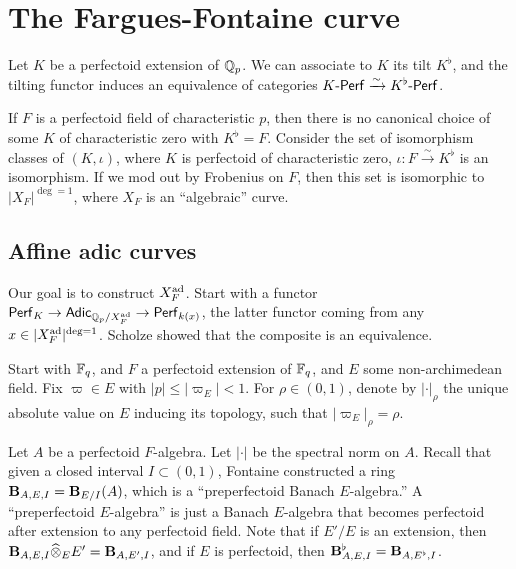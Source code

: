 




\section{The Fargues-Fontaine curve}


Let $K$ be a perfectoid extension of $\mathbb{Q}_p$. We can associate to $K$ its 
tilt $K^\flat$, and the tilting functor induces an equivalence of categories 
$K\textnormal{-}\mathsf{Perf} \xrightarrow\sim K^\flat\textnormal{-}\mathsf{Perf}$. 

If $F$ is a perfectoid field of characteristic $p$, then there is no canonical 
choice of some $K$ of characteristic zero with $K^\flat=F$. Consider the set 
of isomorphism classes of $(K,\iota)$, where $K$ is perfectoid of characteristic 
zero, $\iota:F\xrightarrow\sim K^\flat$ is an isomorphism. If we mod out by 
Frobenius on $F$, then this set is isomorphic to $|X_F|^{\deg=1}$, where 
$X_F$ is an ``algebraic'' curve. 





\subsection{Affine adic curves}

Our goal is to construct $X_F^{\textnormal{ad}}$. Start with a functor 
$\mathsf{Perf}_K \to \mathsf{Adic}_{\mathbb{Q}_p/X_F^{\textnormal{ad}}}\to \mathsf{Perf}_{k(x)}$, 
the latter functor coming from any $x\in |X_F^{\textnormal{ad}}|^{\deg=1}$. Scholze showed 
that the composite is an equivalence. 

Start with $\mathbb{F}_q$, and $F$ a perfectoid extension of $\mathbb{F}_q$, 
and $E$ some non-archimedean field. Fix $\varpi\in E$ with 
$|p|\leqslant |\varpi_E| <1$. For $\rho\in (0,1)$, denote by $|\cdot |_\rho$ 
the unique absolute value on $E$ inducing its topology, such that 
$|\varpi_E|_\rho = \rho$. 

Let $A$ be a perfectoid $F$-algebra. Let $|\cdot|$ be the spectral norm on 
$A$. Recall that given a closed interval $I\subset (0,1)$, Fontaine constructed 
a ring $\mathbf{B}_{A,E,I} = \mathbf{B}_{E/I}(A)$, which is a ``preperfectoid Banach 
$E$-algebra.'' A ``preperfectoid $E$-algebra'' is just a Banach $E$-algebra that 
becomes perfectoid after extension to any perfectoid field. Note that 
if $E'/E$ is an extension, then $\mathbf{B}_{A,E,I}\widehat\otimes_E E' = \mathbf{B}_{A,E',I}$, 
and if $E$ is perfectoid, then $\mathbf{B}_{A,E,I}^\flat = \mathbf{B}_{A,E^\flat,I}$. 

